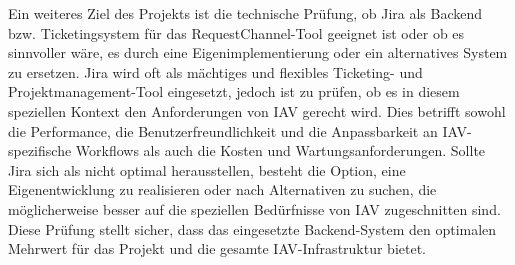 \newline
Ein weiteres Ziel des Projekts ist die technische Prüfung, ob Jira als Backend bzw. Ticketingsystem für das RequestChannel-Tool geeignet ist oder ob es sinnvoller wäre, es durch eine Eigenimplementierung oder ein alternatives System zu ersetzen. Jira wird oft als mächtiges und flexibles Ticketing- und Projektmanagement-Tool eingesetzt, jedoch ist zu prüfen, ob es in diesem speziellen Kontext den Anforderungen von IAV gerecht wird. Dies betrifft sowohl die Performance, die Benutzerfreundlichkeit und die Anpassbarkeit an IAV-spezifische Workflows als auch die Kosten und Wartungsanforderungen. Sollte Jira sich als nicht optimal herausstellen, besteht die Option, eine Eigenentwicklung zu realisieren oder nach Alternativen zu suchen, die möglicherweise besser auf die speziellen Bedürfnisse von IAV zugeschnitten sind. Diese Prüfung stellt sicher, dass das eingesetzte Backend-System den optimalen Mehrwert für das Projekt und die gesamte IAV-Infrastruktur bietet.


